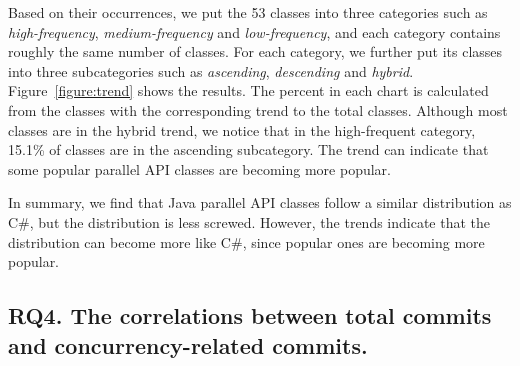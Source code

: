 Based on their occurrences, we put the 53 classes into three categories such as \emph{high-frequency}, \emph{medium-frequency} and \emph{low-frequency}, and each category contains roughly the same number of classes. For each category, we further put its classes into three subcategories such as \emph{ascending}, \emph{descending} and \emph{hybrid}. Figure~\ref{figure:trend} shows the results. The percent in each chart is calculated from the classes with the corresponding trend to the total classes. Although most classes are in the hybrid trend, we notice that in the high-frequent category, 15.1\% of classes are in the ascending subcategory. The trend can indicate that some popular parallel API classes are becoming more popular.

In summary, we find that Java parallel API classes follow a similar distribution as C\#, but the distribution is less screwed. However, the trends indicate that the distribution can become more like C\#, since popular ones are becoming more popular.





\subsection{RQ4. The correlations between total commits and concurrency-related commits.}
\label{sec:result:correlation}




